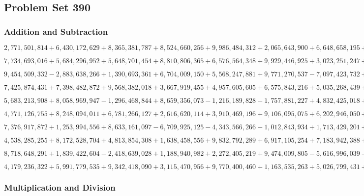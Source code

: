 \hypertarget{problem-set-390}{%
\subsection{Problem Set 390}\label{problem-set-390}}

\hypertarget{addition-and-subtraction}{%
\subsubsection{Addition and
Subtraction}\label{addition-and-subtraction}}

\(2,771,501,814+6,430,172,629+8,365,381,787+8,524,660,256+9,986,484,312+2,065,643,900+6,648,658,195+4,425,213,691+5,578,020,355+5,014,136,428\)

\(7,734,693,016+5,684,296,952+5,648,701,454+8,810,806,365+6,576,564,348+9,929,446,925+3,023,251,247+8,690,468,619+3,826,175,072+2,550,253,226\)

\(9,454,509,332-2,883,638,266+1,390,693,361+6,704,009,150+5,568,247,881+9,771,270,537-7,097,423,732+5,606,845,766-2,740,139,785-3,442,737,455\)

\(7,425,874,431+7,398,482,872+9,568,382,018+3,667,919,455+4,957,605,605+6,575,843,216+5,035,268,439+3,870,345,544+1,082,435,214+4,127,739,666\)

\(5,683,213,908+8,058,969,947-1,296,468,844+8,659,356,073-1,216,189,828-1,757,881,227+4,832,425,018+8,471,701,810-2,563,394,493+4,207,528,206\)

\(4,771,126,755+8,248,094,011+6,781,266,127+2,616,620,114+3,910,469,196+9,106,095,075+6,202,946,050+8,715,687,631+4,141,120,299+9,503,571,095\)

\(7,376,917,872+1,253,994,556+8,633,161,097-6,709,925,125-4,343,566,266-1,012,843,934+1,713,429,201+3,400,381,727-9,478,492,651+2,494,511,612\)

\(4,538,285,255+8,172,528,704+4,813,854,308+1,638,458,556+9,832,792,289+6,917,105,254+7,183,942,388+4,144,623,224+3,670,320,132+1,994,247,339\)

\(8,718,648,291+1,839,422,604-2,418,639,028+1,188,940,982+2,272,405,219+9,474,009,805-5,616,996,039-1,527,806,565-6,000,091,898+4,943,543,436\)

\(4,179,236,322+5,991,779,535+9,342,418,090+3,115,470,956+9,770,400,460+1,163,535,263+5,026,799,431+9,428,696,843+5,306,376,438+4,390,076,993\)

\hypertarget{multiplication-and-division}{%
\subsubsection{Multiplication and
Division}\label{multiplication-and-division}}


